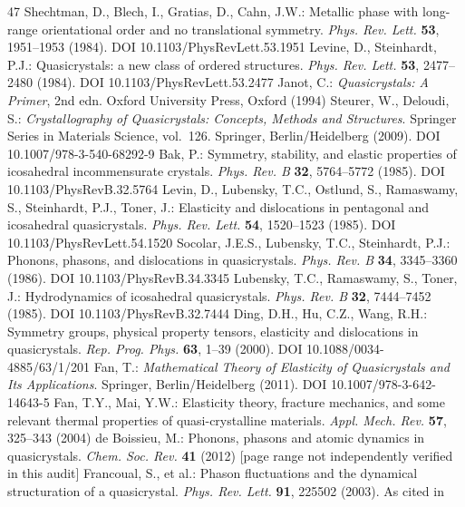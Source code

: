 \documentclass[11pt]{article}
\begin{document}
\begin{thebibliography}{47}\small
{} Shechtman, D., Blech, I., Gratias, D., Cahn, J.W.: Metallic phase with long-range orientational order and no translational symmetry. \emph{Phys. Rev. Lett.} \textbf{53}, 1951--1953 (1984). DOI 10.1103/PhysRevLett.53.1951
 Levine, D., Steinhardt, P.J.: Quasicrystals: a new class of ordered structures. \emph{Phys. Rev. Lett.} \textbf{53}, 2477--2480 (1984). DOI 10.1103/PhysRevLett.53.2477
 Janot, C.: \emph{Quasicrystals: A Primer}, 2nd edn. Oxford University Press, Oxford (1994)
 Steurer, W., Deloudi, S.: \emph{Crystallography of Quasicrystals: Concepts, Methods and Structures}. Springer Series in Materials Science, vol.~126. Springer, Berlin/Heidelberg (2009). DOI 10.1007/978-3-540-68292-9
 Bak, P.: Symmetry, stability, and elastic properties of icosahedral incommensurate crystals. \emph{Phys. Rev. B} \textbf{32}, 5764--5772 (1985). DOI 10.1103/PhysRevB.32.5764
 Levin, D., Lubensky, T.C., Ostlund, S., Ramaswamy, S., Steinhardt, P.J., Toner, J.: Elasticity and dislocations in pentagonal and icosahedral quasicrystals. \emph{Phys. Rev. Lett.} \textbf{54}, 1520--1523 (1985). DOI 10.1103/PhysRevLett.54.1520
 Socolar, J.E.S., Lubensky, T.C., Steinhardt, P.J.: Phonons, phasons, and dislocations in quasicrystals. \emph{Phys. Rev. B} \textbf{34}, 3345--3360 (1986). DOI 10.1103/PhysRevB.34.3345
 Lubensky, T.C., Ramaswamy, S., Toner, J.: Hydrodynamics of icosahedral quasicrystals. \emph{Phys. Rev. B} \textbf{32}, 7444--7452 (1985). DOI 10.1103/PhysRevB.32.7444
 Ding, D.H., Hu, C.Z., Wang, R.H.: Symmetry groups, physical property tensors, elasticity and dislocations in quasicrystals. \emph{Rep. Prog. Phys.} \textbf{63}, 1--39 (2000). DOI 10.1088/0034-4885/63/1/201
 Fan, T.: \emph{Mathematical Theory of Elasticity of Quasicrystals and Its Applications}. Springer, Berlin/Heidelberg (2011). DOI 10.1007/978-3-642-14643-5
 Fan, T.Y., Mai, Y.W.: Elasticity theory, fracture mechanics, and some relevant thermal properties of quasi-crystalline materials. \emph{Appl. Mech. Rev.} \textbf{57}, 325--343 (2004)
 de Boissieu, M.: Phonons, phasons and atomic dynamics in quasicrystals. \emph{Chem. Soc. Rev.} \textbf{41} (2012) [page range not independently verified in this audit]
 Francoual, S., et al.: Phason fluctuations and the dynamical structuration of a quasicrystal. \emph{Phys. Rev. Lett.} \textbf{91}, 225502 (2003). As cited in \cite{agiasofitou2014}

\end{thebibliography}
\end{document}
